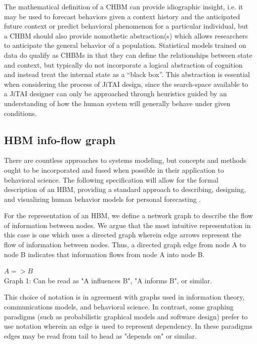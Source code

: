 \documentclass[runningheads,a4paper]{llncs}
\begin{document}
The mathematical definition of a CHBM can provide idiographic insight, i.e. it may be used to forecast behaviors given a context history and the anticipated future context or predict behavioral phenomenon for a particular individual, but a CHBM should also provide nomothetic abstraction(s) which allows researchers to anticipate the general behavior of a population.
Statistical models trained on data do qualify as CHBMs in that they can define the relationships between state and context, but typically do not incorporate a logical abstraction of cognition and instead treat the internal state as a “black box”.
This abstraction is essential when considering the process of JiTAI design, since the search-space available to a JiTAI designer can only be approached through heuristics guided by an understanding of how the human system will generally behave under given conditions.

\subsection{HBM info-flow graph}
There are countless approaches to systems modeling, but concepts and methods ought to be incorporated and fused when possible in their application to behavioral science.
The following specification will allow for the formal description of an HBM, providing a standard approach to describing, designing, and visualizing human behavior models for personal forecasting .

For the representation of an HBM, we define a network graph to describe the flow of information between nodes.
We argue that the most intuitive representation in this case is one which uses a directed graph wherein edge arrows represent the flow of information between nodes.
Thus, a directed graph edge from node A to node B indicates that information flows from node A into node B. 

\begin{centering}
  $A => B$\\
  \small{Graph 1: Can be read as "A influences B", "A informs B", or similar.}
\end{centering}
  
This choice of notation is in agreement with graphs used in information theory, communications models, and behavioral science.
In contrast, some graphing paradigms (such as probabilistic graphical models and software design) prefer to use notation wherein an edge is used to represent dependency.
In these paradigms edges may be read from tail to head as "depends on" or similar.
\end{document}
